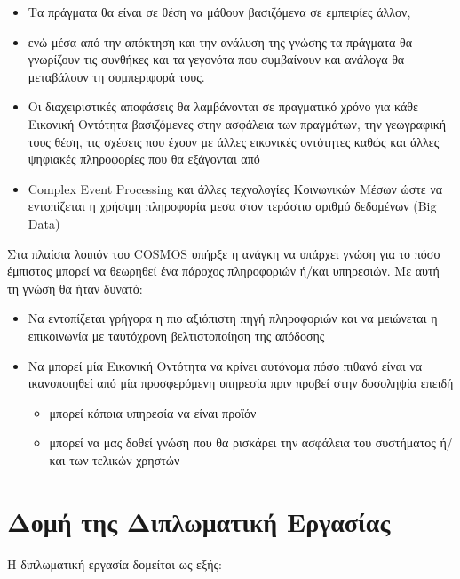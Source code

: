 \begin{itemize}
\item
Τα πράγματα θα είναι σε θέση να μάθουν βασιζόμενα σε εμπειρίες άλλον,
\item
 ενώ μέσα από την απόκτηση και την ανάλυση της γνώσης τα πράγματα θα γνωρίζουν τις συνθήκες και τα γεγονότα που συμβαίνουν και ανάλογα θα μεταβάλουν τη συμπεριφορά τους.
\item Οι διαχειριστικές αποφάσεις θα λαμβάνονται σε πραγματικό χρόνο για κάθε Εικονική Οντότητα βασιζόμενες στην ασφάλεια των πραγμάτων, την γεωγραφική τους θέση, τις σχέσεις που έχουν με άλλες εικονικές οντότητες καθώς και άλλες ψηφιακές πληροφορίες που θα εξάγονται από
\item Complex Event Processing και άλλες τεχνολογίες Κοινωνικών Mέσων ώστε να εντοπίζεται η χρήσιμη πληροφορία μεσα στον τεράστιο αριθμό δεδομένων (Big Data)
\end{itemize}


Στα πλαίσια λοιπόν του COSMOS  υπήρξε η ανάγκη να υπάρχει γνώση για το πόσο έμπιστος μπορεί να θεωρηθεί ένα πάροχος πληροφοριών ή/και υπηρεσιών. Με αυτή τη γνώση θα ήταν δυνατό: 
\begin{itemize}
	 \item Να εντοπίζεται γρήγορα η πιο αξιόπιστη πηγή πληροφοριών και να μειώνεται η επικοινωνία με ταυτόχρονη βελτιστοποίηση της απόδοσης
	 
 	 \item Να μπορεί μία Εικονική Οντότητα να κρίνει αυτόνομα πόσο πιθανό είναι να ικανοποιηθεί από μία προσφερόμενη υπηρεσία πριν προβεί στην δοσοληψία επειδή
 	 \begin{itemize}
 	 	\item μπορεί κάποια υπηρεσία να είναι προϊόν
 	 	\item μπορεί να μας δοθεί γνώση που θα ρισκάρει την ασφάλεια του συστήματος ή/και των τελικών χρηστών
 	 	\end{itemize}
\end{itemize}
 

\section{Δομή της Διπλωματική Εργασίας} 
Η διπλωματική εργασία δομείται ως εξής:

